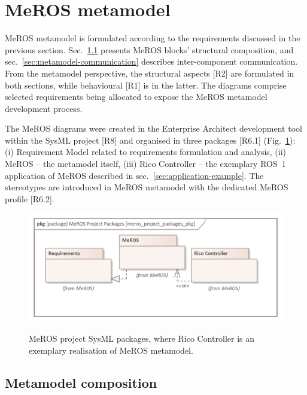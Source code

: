 \section{MeROS metamodel}
\label{sec:metamodel}

MeROS metamodel is formulated according to the requirements discussed in the previous section. Sec.~\ref{sec:metamodel-composition} presents MeROS blocks' structural composition, and sec.~\ref{sec:metamodel-communication} describes inter-component communication. From the metamodel perspective, the structural aspects [R2] are formulated in both sections, while behavioural [R1] is in the latter. The diagrams comprise selected requirements being allocated to expose the MeROS metamodel development process.

The MeROS diagrams were created in the Enterprise Architect development tool within the SysML project [R8] and organised in three packages [R6.1] (Fig.~\ref{fig:meros_project_packages_pkg}): (i) Requirement Model related to requirements formulation and analysis, (ii) MeROS -- the metamodel itself, (iii) Rico Controller -- the exemplary ROS~1 application of MeROS described in sec.~\ref{sec:application-example}. The stereotypes are introduced in MeROS metamodel with the dedicated MeROS profile [R6.2].


\begin{figure}[H]
    \centering
    \begin{center}
    {\includegraphics[scale=1.0]{../imgs/meros_project_packages_pkg.png}}
    \end{center}
    \caption{MeROS project SysML packages, where Rico Controller is an exemplary realisation of MeROS metamodel.}
    \label{fig:meros_project_packages_pkg}
\end{figure}

\subsection{Metamodel composition}
\label{sec:metamodel-composition}

